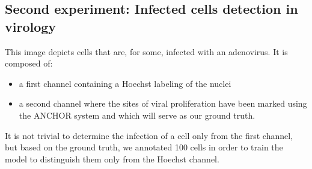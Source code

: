 \documentclass{article}
\begin{document}
\subsection{Second experiment: Infected cells detection in virology}

This image depicts cells that are, for some, infected with an adenovirus. It is composed of:
\begin{itemize}
  \item a first channel containing a Hoechst labeling of the nuclei
  \item a second channel where the sites of viral proliferation have been marked using the ANCHOR system and which will serve as our ground truth.
\end{itemize}
 It is not trivial to determine the infection of a cell only from the first channel, but based on the ground truth, we annotated 100 cells in order to train the model to distinguish them only from the Hoechst channel.    
\end{document}
